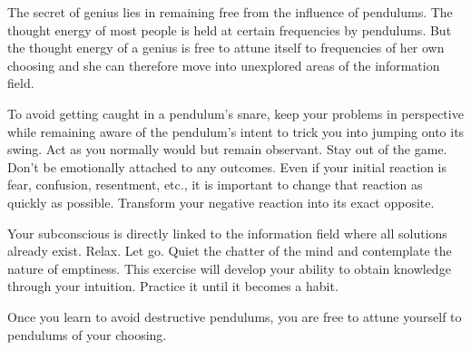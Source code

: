 \documentclass[
  openany]{book}
\begin{document}
The secret of genius lies in remaining free from the influence of pendulums. The thought energy of most people is held at certain frequencies by pendulums. But the thought energy of a genius is free to attune itself to frequencies of her own choosing and she can therefore move into unexplored areas of the information field.

To avoid getting caught in a pendulum's snare, keep your problems in perspective while remaining aware of the pendulum's intent to trick you into jumping onto its swing. Act as you normally would but remain observant. Stay out of the game. Don't be emotionally attached to any outcomes. Even if your initial reaction is fear, confusion, resentment, etc., it is important to change that reaction as quickly as possible. Transform your negative reaction into its exact opposite.

Your subconscious is directly linked to the information field where all solutions already exist. Relax. Let go. Quiet the chatter of the mind and contemplate the nature of emptiness. This exercise will develop your ability to obtain knowledge through your intuition. Practice it until it becomes a habit.

Once you learn to avoid destructive pendulums, you are free to attune yourself to pendulums of your choosing.
\end{document}
